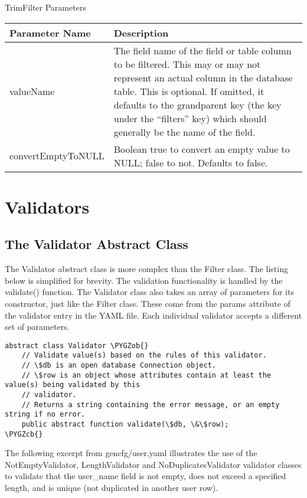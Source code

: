 \documentclass[letterpaper,10pt,english]{sphinxmanual}
\def\PYGZob{\char`\{}
\def\PYGZcb{\char`\}}
\begin{document}
TrimFilter Parameters

\begin{tabulary}{\linewidth}{|L|L|}
\hline
\textbf{
Parameter Name
} & \textbf{
Description
}\\\hline

valueName
 & 
The field name of the field or table column to be filtered.  This may or may not
represent an actual column in the database table.  This is optional.  If omitted,
it defaults to the grandparent key (the key under the ``filters'' key) which should
generally be the name of the field.
\\\hline

convertEmptyToNULL
 & 
Boolean true to convert an empty value to NULL; false to not.  Defaults to false.
\\\hline
\end{tabulary}



\section{Validators}
\label{jaxFrameworkGuide:validators}

\subsection{The Validator Abstract Class}
\label{jaxFrameworkGuide:the-validator-abstract-class}
The Validator abstract class is more complex than the Filter class.  The listing below is simplified
for brevity.  The validation functionality is handled by the validate() function.  The Validator
class also takes an array of parameters for its constructor, just like the Filter class.  These come
from the params attribute of the validator entry in the YAML file.  Each individual validator
accepts a different set of parameters.

\begin{Verbatim}[commandchars=\\\{\}]
abstract class Validator \PYGZob{}
    // Validate value(s) based on the rules of this validator.
    // \$db is an open database Connection object.
    // \$row is an object whose attributes contain at least the value(s) being validated by this
    // validator.
    // Returns a string containing the error message, or an empty string if no error.
    public abstract function validate(\$db, \&\$row);
\PYGZcb{}
\end{Verbatim}

The following excerpt from gencfg/user.yaml illustrates the use of the NotEmptyValidator,
LengthValidator and NoDuplicatesValidator validator classes to validate that the user\_name field is
not empty, does not exceed a specified length, and is unique (not duplicated in another user row).
\end{document}
